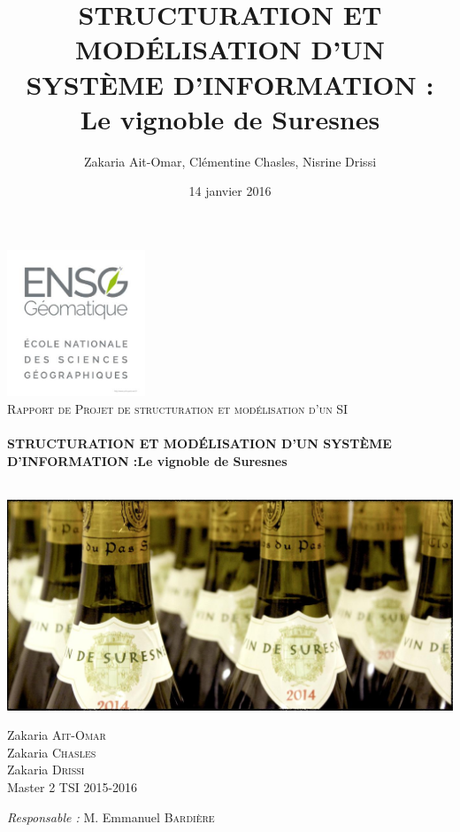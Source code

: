 \documentclass[a4paper, title]{report}
\title{STRUCTURATION ET MODÉLISATION D'UN SYSTÈME D'INFORMATION : Le
vignoble de Suresnes}      %
\author{Zakaria Ait-Omar, Clémentine Chasles, Nisrine Drissi}
\date{14 janvier 2016}     %
\begin{document}
\begin{titlepage}
  \begin{sffamily}
  \begin{center}

    \includegraphics[widht=4.13cm, height=4.38cm]{Images/ensg.jpg}~\\[1.5cm]

    \textsc{\Large Rapport de Projet de structuration et modélisation d'un SI}\\[1.5cm]

    \HRule \\[0.4cm]
    { \huge \bfseries STRUCTURATION ET MODÉLISATION D'UN SYSTÈME D'INFORMATION :\newline Le vignoble de Suresnes\\[0.4cm] }

    \HRule \\[2cm]
    \includegraphics{Images/pagecouv.jpg}
    \\[2cm]

    \begin{minipage}{0.4\textwidth}
      \begin{flushleft} \large
        Zakaria \textsc{Ait-Omar}\\
        Zakaria \textsc{Chasles}\\
        Zakaria \textsc{Drissi}\\
        Master 2 TSI 2015-2016\\
      \end{flushleft}
    \end{minipage}
    \begin{minipage}{0.4\textwidth}
      \begin{flushright} \large
        \emph{Responsable :} M. Emmanuel \textsc{Bardière}\\
      \end{flushright}
    \end{minipage}


\end{center}
\end{sffamily}
\end{titlepage}
\end{document}
